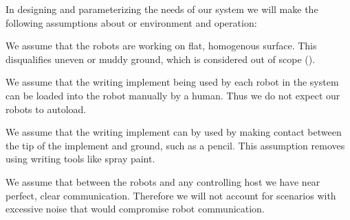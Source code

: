 In designing and parameterizing the needs of our system we will make the following assumptions about or environment and operation: 
\begin{list}{A:~}{}
\item We assume that the robots are working on flat, homogenous surface. This disqualifies uneven or muddy ground, which is considered out of scope ().
\item We assume that the writing implement being used by each robot in the system can be loaded into the robot manually by a human. Thus we do not expect our robots to autoload. 
\item We assume that the writing implement can by used by making contact between the tip of the implement and ground, such as a pencil. This assumption removes using writing tools like spray paint.
\item We assume that between the robots and any controlling host we have near perfect, clear communication. Therefore we will not account for scenarios with excessive noise that would compromise robot communication.  
\end{list}


